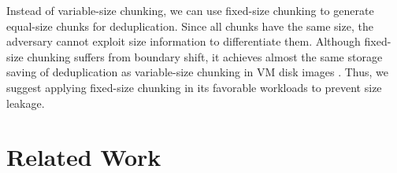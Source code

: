 \documentclass[bachelor]{thesis-uestc}
\begin{document}
  
  Instead of variable-size chunking, we can use fixed-size chunking to 
 generate equal-size chunks for deduplication. Since all chunks have the same size, the adversary cannot exploit size information to differentiate them.  Although fixed-size chunking suffers from boundary shift, it achieves almost the same storage saving of deduplication as variable-size chunking in VM disk images \cite{jin09}. Thus, we suggest applying fixed-size chunking in its favorable workloads to prevent size leakage.  

      
  

  


\chapter{Related Work}
\label{sec:related}
\end{document}

